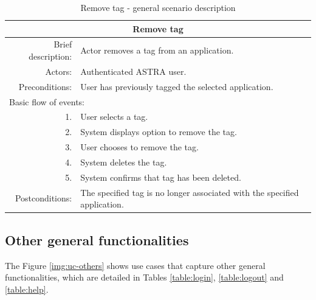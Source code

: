 \begin{table}[h!]
	\small
    \begin{center}
		\begin{tabular}{||r|l||}
		\hline \hline
		\multicolumn{2}{||c||}{\bfseries{Remove tag}} \\
		\hline
		\hline 
		Brief description: & Actor removes a tag from an application. \\
		\hline
		Actors: & Authenticated ASTRA user. \\
		\hline
		Preconditions: & User has previously tagged the selected application. \\
		\hline \hline
		\multicolumn{2}{||l||}{Basic flow of events:} \\
		\hline \hline
			1. & User selects a tag. \\
			2. & System displays option to remove the tag. \\
			3. & User chooses to remove the tag. \\
			4. & System deletes the tag.\\ 
			5. & System confirms that tag has been deleted. \\
		\hline \hline
		Postconditions: & The specified tag is no longer associated with the
		specified application. \\ \hline \hline
		\end{tabular}
		\caption{\label{table:remove-tag}Remove tag - general scenario description}
	\end{center}
\end{table}

\clearpage

\subsection{Other general functionalities}
\label{subsec:others-use-cases}
The Figure \ref{img:uc-others} shows use cases that capture other general
functionalities, which are detailed in Tables \ref{table:login}, 
\ref{table:logout} and \ref{table:help}.

